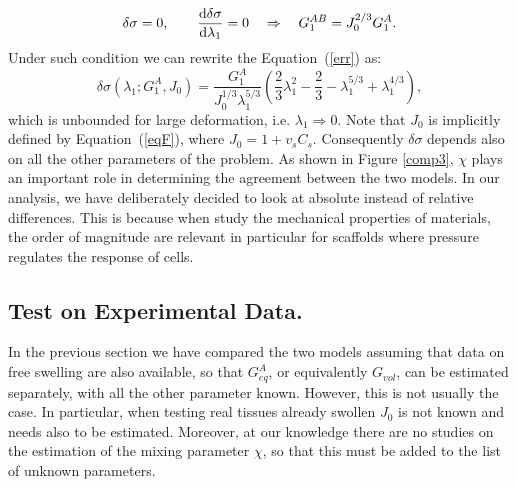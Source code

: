 \begin{equation}
\delta \sigma=0, \qquad \frac{\text{d} \delta \sigma}{\text{d} \lambda_1}=0 \quad\Rightarrow \quad G_1^{AB} = J_0^{2/3}G_1^A.
\end{equation}
Under such condition we can rewrite the Equation~(\ref{err}) as:
\begin{equation}
\delta \sigma(\lambda_1;G^A_1,J_0) = \frac{G_1^A}{J^{1/3}_0\lambda_1^{5/3}} \left(\frac{2}{3}\lambda^2_1-\frac{2}{3}-\lambda_1^{5/3}+\lambda_1^{4/3}\right), 
\end{equation}
which is unbounded for large deformation, i.e. $\lambda_1\Rightarrow0$. Note that $J_0$ is implicitly defined by Equation~(\ref{eqF}), where $J_0=1+v_sC_s$. Consequently $\delta\sigma$ depends also on all the other parameters of the problem. As shown in Figure \ref{comp3}, $\chi$ plays an important role in determining the agreement between the two models. In our analysis, we have deliberately decided to look at absolute instead of relative differences. This is because when study the mechanical properties of materials, the order of magnitude are relevant in particular for scaffolds where pressure regulates the response of cells.


\subsection{Test on Experimental Data.}
In the previous section we have compared the two models assuming that data on free swelling are also available, so that $G^A_{eq}$, or equivalently $G_{vol}$, can be estimated separately, with all the other parameter known. However, this is not usually the case. In particular, when testing real tissues already swollen $J_0$ is not known and needs also to be estimated. Moreover, at our knowledge there are no studies on the estimation of the mixing parameter $\chi$, so that this must be added to the list of unknown parameters. 

